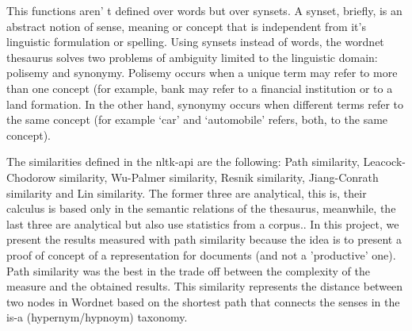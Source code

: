 \documentclass{pnastwo}
\newcommand\sq[1]{\textquoteleft #1\textquoteright}
\begin{document}
\begin{article}
This functions aren' t defined over words but over synsets. A synset, briefly, is an abstract notion of sense, meaning or concept that is independent from it's linguistic formulation or spelling. Using synsets instead of words, the wordnet thesaurus solves two problems of ambiguity limited to the linguistic domain: polisemy and synonymy. Polisemy occurs when a unique term may refer to more than one concept (for example, bank may refer to a financial institution or to a land formation. In the other hand, synonymy occurs when different terms refer to the same concept (for example \sq{car} and \sq{automobile} refers, both, to the same concept).

The similarities defined in the nltk-api are the following: Path similarity, Leacock-Chodorow similarity, Wu-Palmer similarity, Resnik similarity, Jiang-Conrath similarity and Lin similarity. The former three are analytical, this is, their calculus is based only in the semantic relations of the thesaurus, meanwhile, the last three are analytical but also use statistics from a corpus.\cite{BUDANITSKY}\cite{BUDANITSKY_2}. In this project, we present the results measured with path similarity because the idea is to present a proof of concept of a representation for documents (and not a 'productive' one). Path similarity was the best in the trade off between the complexity of the measure and the obtained results. This similarity represents the distance between two nodes in Wordnet based on the shortest path that connects the senses in the is-a (hypernym/hypnoym) taxonomy.



\end{article}
\end{document}
